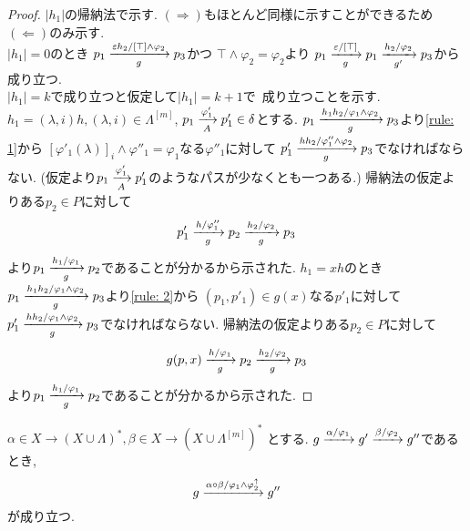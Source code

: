\documentclass[uplatex,dvipdfmx,a4j]{jsreport}
\begin{document}
  \begin{proof}
    $|h_1|$の帰納法で示す.
    $(\Rightarrow)$もほとんど同様に示すことができるため
    $(\Leftarrow)$のみ示す. \\
    $|h_1| = 0$のとき
    $p_1 \transarrow{\varepsilon h_2 / [\top] \land \varphi_2}{g} p_3$かつ
    $\top \land \varphi_2 = \varphi_2$より
    $p_1 \transarrow{\varepsilon / [\top]}{g} p_1
      \transarrow{h_2 / \varphi_2}{g'} p_3$から成り立つ. \\
    $|h_1| = k$で成り立つと仮定して$|h_1| = k + 1$で 成り立つことを示す. \\
    $h_1 = (\lambda, i) h, (\lambda, i) \in \Lambda^{[m]}$,
    $p_1 \transarrow{\varphi'_1}{A} p'_1 \in \delta$とする.
    $p_1 \transarrow{h_1 h_2 / \varphi_1 \land \varphi_2}{g} p_3$より\ref{rule: 1}から
    $[\varphi'_1(\lambda)]_i \land \varphi''_1 = \varphi_1$なる$\varphi''_1$に対して
    $p'_1 \transarrow{h h_2 / \varphi''_1 \land \varphi_2}{g} p_3$でなければならない.
    (仮定より$p_1 \transarrow{\varphi'_1}{A} p'_1$のようなパスが少なくとも一つある.)
    帰納法の仮定よりある$p_2 \in P$に対して
    \[
      p'_1 \transarrow{h / \varphi''_1}{g} p_2 \transarrow{h_2 / \varphi_2}{g} p_3
    \]
    より$p_1 \transarrow{h_1 / \varphi_1}{g} p_2$であることが分かるから示された.
    $h_1 = x h$のとき
    $p_1 \transarrow{h_1 h_2 / \varphi_1 \land \varphi_2}{g} p_3$より\ref{rule: 2}から
    $(p_1, p'_1) \in g(x)$なる$p'_1$に対して
    $p'_1 \transarrow{h h_2 / \varphi_1 \land \varphi_2}{g} p_3$でなければならない.
    帰納法の仮定よりある$p_2 \in P$に対して
    \[
      g(p, x) \transarrow{h / \varphi_1}{g} p_2 \transarrow{h_2 / \varphi_2}{g} p_3
    \]
    より$p_1 \transarrow{h_1 / \varphi_1}{g} p_2$であることが分かるから示された.
  \end{proof}

  \begin{lemma} \label{relation_over_g_is_associative_right}
    $\alpha \in X \rightarrow (X \cup \Lambda)^*, \beta \in X \rightarrow (X \cup \Lambda^{[m]})^*$
    とする.
    $g \transarrow{\alpha / \varphi_1}{} g' \transarrow{\beta / \varphi_2}{} g''$であるとき,
    \[
      g \transarrow{\alpha \circ \beta / \varphi_1 \land \varphi_2^\uparrow}{} g''
    \]
    が成り立つ.
  \end{lemma}
\end{document}
